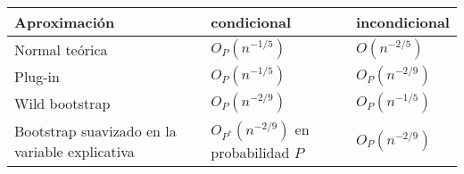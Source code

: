 \documentclass[
]{book}
\theoremstyle{break}
\theoremstyle{definition}
\theoremstyle{definition}
\theoremstyle{definition}
\theoremstyle{remark}
\begin{document}
\begin{longtable}[]{@{}lll@{}}
\toprule
\begin{minipage}[b]{0.25\columnwidth}\raggedright
Aproximación\strut
\end{minipage} & \begin{minipage}[b]{0.37\columnwidth}\raggedright
condicional\strut
\end{minipage} & \begin{minipage}[b]{0.29\columnwidth}\raggedright
incondicional\strut
\end{minipage}\tabularnewline
\midrule
\endhead
\begin{minipage}[t]{0.25\columnwidth}\raggedright
Normal teórica\strut
\end{minipage} & \begin{minipage}[t]{0.37\columnwidth}\raggedright
\(O_{P}\left( n^{-1/5}\right)\)\strut
\end{minipage} & \begin{minipage}[t]{0.29\columnwidth}\raggedright
\(O\left(n^{-2/5}\right)\)\strut
\end{minipage}\tabularnewline
\begin{minipage}[t]{0.25\columnwidth}\raggedright
Plug-in\strut
\end{minipage} & \begin{minipage}[t]{0.37\columnwidth}\raggedright
\(O_{P}\left( n^{-1/5}\right)\)\strut
\end{minipage} & \begin{minipage}[t]{0.29\columnwidth}\raggedright
\(O_{P}\left( n^{-2/9}\right)\)\strut
\end{minipage}\tabularnewline
\begin{minipage}[t]{0.25\columnwidth}\raggedright
Wild bootstrap\strut
\end{minipage} & \begin{minipage}[t]{0.37\columnwidth}\raggedright
\(O_{P}\left( n^{-2/9}\right)\)\strut
\end{minipage} & \begin{minipage}[t]{0.29\columnwidth}\raggedright
\(O_{P}\left(n^{-1/5}\right)\)\strut
\end{minipage}\tabularnewline
\begin{minipage}[t]{0.25\columnwidth}\raggedright
Bootstrap suavizado
en la variable
explicativa\strut
\end{minipage} & \begin{minipage}[t]{0.37\columnwidth}\raggedright
\(O_{P^{\ast}}\left( n^{-2/9}\right)\)
en probabilidad \(P\)\strut
\end{minipage} & \begin{minipage}[t]{0.29\columnwidth}\raggedright
\(O_{P}\left(n^{-2/9}\right)\)\strut
\end{minipage}\tabularnewline
\bottomrule
\end{longtable}
\end{document}
